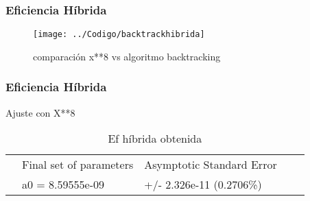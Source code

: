 \documentclass{beamer}
\begin{document}
\begin{frame}
	\frametitle{Eficiencia Híbrida}	

		\begin{figure}[H]
\centering
\texttt{[image: ../Codigo/backtrackhibrida]}
\caption{comparación x**8 vs algoritmo backtracking}
\label{fig:backtrackhibrida}
\end{figure}


	
\end{frame}

\begin{frame}
	\frametitle{Eficiencia Híbrida}	
	Ajuste con X**8

	\begin{table}[]
		\centering
		\caption{Ef híbrida obtenida}
		\label{my-label}
		\begin{tabular}{lllll}
			& Final set of parameters &   Asymptotic Standard Error & \\
			& a0  = 8.59555e-09 &  +/- 2.326e-11    (0.2706\%)&  \\
		
		\end{tabular}
	\end{table}
	
	
	
\end{frame}
\end{document}
